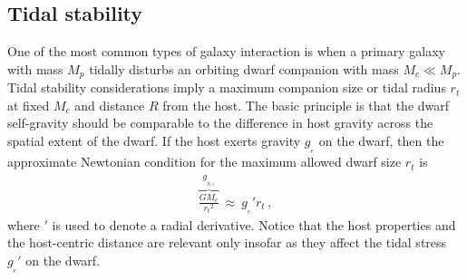 \documentclass[fleqn,usenatbib,useAMS,onecolumn]{mnras} %
\begin{document}
\subsection{Tidal stability}
\label{Tidal_stability}

One of the most common types of galaxy interaction is when a primary galaxy with mass $M_p$ tidally disturbs an orbiting dwarf companion with mass $M_c \ll M_p$. Tidal stability considerations imply a maximum companion size or tidal radius $r_t$ at fixed $M_c$ and distance $R$ from the host. The basic principle is that the dwarf self-gravity should be comparable to the difference in host gravity across the spatial extent of the dwarf. If the host exerts gravity $g_{_e}$ on the dwarf, then the approximate Newtonian condition for the maximum allowed dwarf size $r_t$ is
\begin{eqnarray}
	\overbrace{\frac{GM_c}{{r_t}^2}}^{g_{_{N,i}}} ~\approx~ g_{_e}' r_t \, ,
	\label{r_tid_Newton}
\end{eqnarray}
where $'$ is used to denote a radial derivative. Notice that the host properties and the host-centric distance are relevant only insofar as they affect the tidal stress $g_{_e}'$ on the dwarf.
\end{document}
